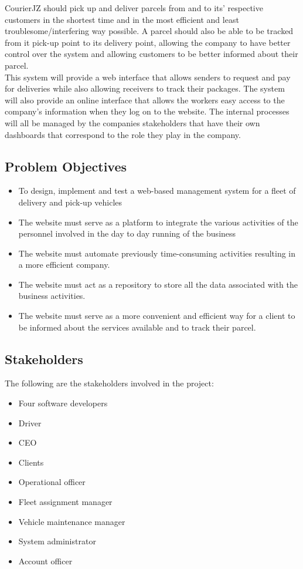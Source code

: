 \documentclass[paper=a4, fontsize=11pt]{scrartcl} %
\numberwithin{equation}{section} %
\numberwithin{figure}{section} %
\numberwithin{table}{section} %
\begin{document}
CourierJZ should pick up and deliver parcels from and to its' respective customers in the shortest time and in the most efficient and least troublesome/interfering way possible. A parcel should also be able to be tracked from it pick-up point to its delivery point, allowing the company to have better control over the system and allowing customers to be better informed about their parcel. \\

This system will provide a web interface that allows senders to request and pay for deliveries while also allowing receivers to track their packages. The system will also provide an online interface that allows the workers easy access to the company's information when they log on to the website. The internal processes will all be managed by the companies stakeholders that have their own dashboards that correspond to the role they play in the company.\\



\subsection{Problem Objectives}
\begin{itemize}
\item To design, implement and test a web-based management system for a fleet of delivery and pick-up vehicles
\item The website must serve as a platform to integrate the various activities of the personnel involved in the day to day running of the business
\item The website must automate previously time-consuming activities resulting in a  more efficient company.
\item The website must act as a repository  to store all the data associated with the business activities.
\item The website must serve as a more convenient and efficient way for a client to be informed about the services available and to track their parcel.
\end{itemize}

\subsection{Stakeholders}
The following are the stakeholders involved in the project:
\begin{itemize}
\item Four software developers
\item Driver
\item CEO
\item Clients
\item Operational officer
\item Fleet assignment manager
\item Vehicle maintenance manager
\item System administrator
\item Account officer
\end{itemize}
\end{document}

